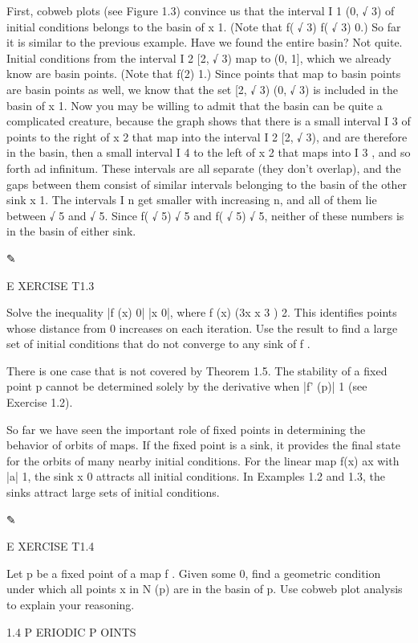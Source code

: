 \documentclass[12pt]{article}
\begin{document}
First, cobweb plots (see Figure 1.3) convince us that the interval I 1  (0, √ 3) of initial conditions 
belongs to the basin of x  1. (Note that f( √ 3)  f( √ 3)  0.) So far it is similar to the previous 
example. Have we found the entire basin? Not quite. Initial conditions from the interval I 2  [2,  √ 3) 
map to (0, 1], which we already know are basin points. (Note that f(2)  1.) Since points that map to basin 
points are basin points as well, we know that the set [2,  √ 3)  (0, √ 3) is included in the basin of x  
1. Now you may be willing to admit that the basin can be quite a complicated creature, because the graph 
shows that there is a small interval I 3 of points to the right of x  2 that map into the interval I 2  [2,  
√ 3), and are therefore in the basin, then a small interval I 4 to the left of x  2 that maps into I 3 , 
and so forth ad inﬁnitum. These intervals are all separate (they don’t overlap), and the gaps between them 
consist of similar intervals belonging to the basin of the other sink x  1. The intervals I n get smaller 
with increasing n, and all of them lie between  √ 5 and √ 5. Since f( √ 5)   √ 5 and f( √ 5)  √ 5, 
neither of these numbers is in the basin of either sink.

✎

E XERCISE T1.3

Solve the inequality |f (x)  0| 
 |x  0|, where f (x)  (3x  x 3 )  2. This identiﬁes points whose distance from 0 increases on each 
iteration. Use the result to ﬁnd a large set of initial conditions that do not converge to any sink of f .

There is one case that is not covered by Theorem 1.5. The stability of a ﬁxed point p cannot be determined 
solely by the derivative when |f' (p)|  1 (see Exercise 1.2).


So far we have seen the important role of ﬁxed points in determining the behavior of orbits of maps. If 
the ﬁxed point is a sink, it provides the ﬁnal state for the orbits of many nearby initial conditions. 
For the linear map f(x)  ax with |a|  1, the sink x  0 attracts all initial conditions. In Examples 1.2 and 
1.3, the sinks attract large sets of initial conditions.

✎

E XERCISE T1.4

Let p be a ﬁxed point of a map f . Given some  
 0, ﬁnd a geometric condition under which all points x in N  (p) are in the basin of p. Use cobweb plot 
analysis to explain your reasoning.

1.4 P ERIODIC P OINTS
\end{document}

